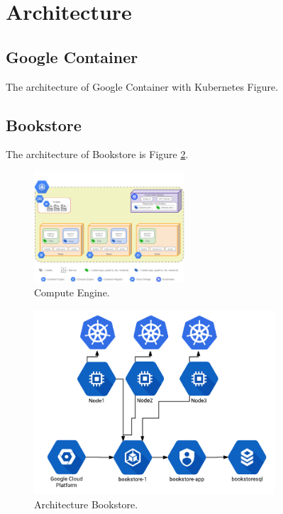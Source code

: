 \documentclass[a4paper]{article}
\begin{document}
\section{Architecture}
\subsection{Google Container}
The architecture of Google Container with Kubernetes Figure.


\subsection{Bookstore}
The architecture of Bookstore is 
Figure \ref{fig:bookstore}.

\begin{figure}
\centering
\includegraphics[width=0.5\textwidth]{grapheComputeEngine.png}
\caption{\label{fig:bookstore}Compute Engine.\cite{omerdawelbeit}}
\end{figure}

\begin{figure}
\centering
\includegraphics[width=0.8\textwidth]{bookstore.png}
\caption{\label{fig:bookstore}Architecture Bookstore.}
\end{figure}



\end{document}
